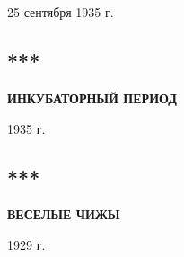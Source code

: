 \documentclass{book}
\begin{document}
\author{\textbf{\Large ДАНИИЛ ХАРМС}}
\date{}

\maketitle

\chapter*{}
\indent
\begin{flushright}
    25 сентября 1935 г.
\end{flushright}
\begin{center}
    \chapter*{***}
    \textbf{ИНКУБАТОРНЫЙ ПЕРИОД}
\end{center}
\indent
\begin{flushright}
    1935 г.
\end{flushright}
\begin{center}
    \chapter*{***}
    \textbf{ВЕСЕЛЫЕ ЧИЖЫ}
\end{center}
\vspace{\baselineskip}


\begin{flushright}
    1929 г.
\end{flushright}
\end{document}
